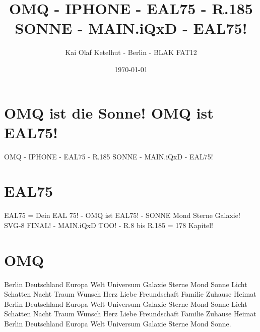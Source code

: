 \documentclass[12pt]{article}
\title{OMQ - IPHONE - EAL75 - R.185 SONNE - MAIN.iQxD - EAL75!}
\author{Kai Olaf Ketelhut - Berlin - BLAK FAT12}
\date{\today}
\begin{document}
\maketitle
\section*{OMQ ist die Sonne! OMQ ist EAL75!}
OMQ - IPHONE - EAL75 - R.185 SONNE - MAIN.iQxD - EAL75!

\section*{EAL75}
EAL75 = Dein EAL 75! - OMQ ist EAL75! - SONNE Mond Sterne Galaxie!
SVG-8 FINAL! - MAIN.iQxD TOO! - R.8 bis R.185 = 178 Kapitel!

\section*{OMQ}
Berlin Deutschland Europa Welt Universum Galaxie Sterne Mond Sonne
Licht Schatten Nacht Traum Wunsch Herz Liebe Freundschaft Familie
Zuhause Heimat Berlin Deutschland Europa Welt Universum Galaxie
Sterne Mond Sonne Licht Schatten Nacht Traum Wunsch Herz Liebe
Freundschaft Familie Zuhause Heimat Berlin Deutschland Europa Welt
Universum Galaxie Sterne Mond Sonne.
\end{document}
